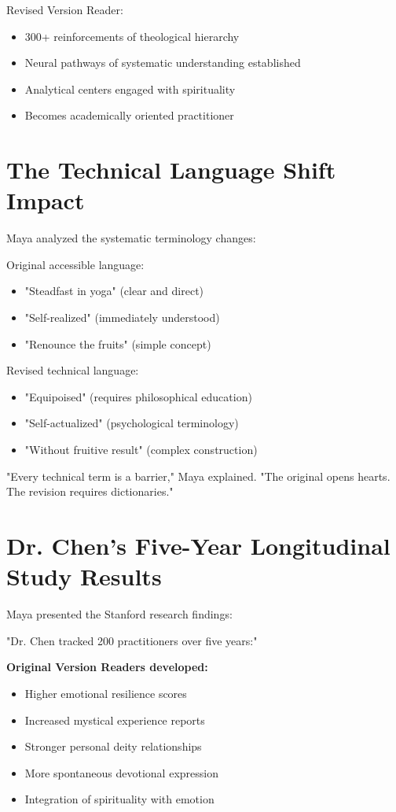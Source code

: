 \documentclass[11pt,twoside]{book}
\begin{document}
Revised Version Reader:
\begin{itemize}
\item 300+ reinforcements of theological hierarchy
\item Neural pathways of systematic understanding established
\item Analytical centers engaged with spirituality
\item Becomes academically oriented practitioner
\end{itemize}
\section*{The Technical Language Shift Impact}
\label{sec:org2d7e9ce}

Maya analyzed the systematic terminology changes:

Original accessible language:
\begin{itemize}
\item "Steadfast in yoga" (clear and direct)
\item "Self-realized" (immediately understood)
\item "Renounce the fruits" (simple concept)
\end{itemize}

Revised technical language:
\begin{itemize}
\item "Equipoised" (requires philosophical education)
\item "Self-actualized" (psychological terminology)
\item "Without fruitive result" (complex construction)
\end{itemize}

"Every technical term is a barrier," Maya explained. "The original opens hearts. The revision requires dictionaries."
\section*{Dr. Chen's Five-Year Longitudinal Study Results}
\label{sec:org44c2378}

Maya presented the Stanford research findings:

"Dr. Chen tracked 200 practitioners over five years:"

\textbf{\textbf{Original Version Readers developed:}}
\begin{itemize}
\item Higher emotional resilience scores
\item Increased mystical experience reports
\item Stronger personal deity relationships
\item More spontaneous devotional expression
\item Integration of spirituality with emotion
\end{itemize}
\end{document}
